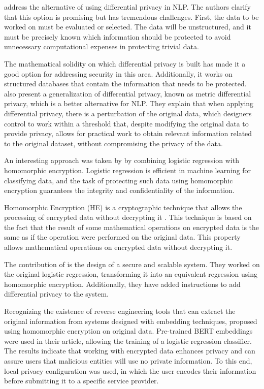 \documentclass[11pt]{article}
\begin{document}
\cite{Klymenko_2022} address the alternative of using differential privacy in NLP. The authors clarify that this option is promising but has tremendous challenges. First, the data to be worked on must be evaluated or selected. The data will be unstructured, and it must be precisely known which information should be protected to avoid unnecessary computational expenses in protecting trivial data.

The mathematical solidity on which differential privacy is built has made it a good option for addressing security in this area. Additionally, it works on structured databases that contain the information that needs to be protected. \cite{Klymenko_2022} also present a generalization of differential privacy, known as metric differential privacy, which is a better alternative for NLP. They explain that when applying differential privacy, there is a perturbation of the original data, which designers control to work within a threshold that, despite modifying the original data to provide privacy, allows for practical work to obtain relevant information related to the original dataset, without compromising the privacy of the data.

An interesting approach was taken by \cite{Aono2016} by combining logistic regression with homomorphic encryption. Logistic regression is efficient in machine learning for classifying data, and the task of protecting such data using homomorphic encryption guarantees the integrity and confidentiality of the information.

Homomorphic Encryption (HE) is a cryptographic technique that allows the processing of encrypted data without decrypting it \cite{Armknecht2015}. This technique is based on the fact that the result of some mathematical operations on encrypted data is the same as if the operation were performed on the original data. This property allows mathematical operations on encrypted data without decrypting it.

The contribution of \cite{Aono2016} is the design of a secure and scalable system. They worked on the original logistic regression, transforming it into an equivalent regression using homomorphic encryption. Additionally, they have added instructions to add differential privacy to the system.

Recognizing the existence of reverse engineering tools that can extract the original information from systems designed with embedding techniques, \cite{Lee2022} proposed using homomorphic encryption on original data. Pre-trained BERT embeddings were used in their article, allowing the training of a logistic regression classifier. The results indicate that working with encrypted data enhances privacy and can assure users that malicious entities will use no private information. To this end, local privacy configuration was used, in which the user encodes their information before submitting it to a specific service provider.
\end{document}
